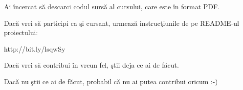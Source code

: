 Ai încercat să descarci codul sursă al cursului, care este în format PDF.

Dacă vrei să participi ca şi cursant, urmează instrucţiunile de pe README-ul
proiectului:

http://bit.ly/lsqwSy

Dacă vrei să contribui în vreun fel, ştii deja ce ai de făcut.

Dacă nu ştii ce ai de făcut, probabil că nu ai putea contribui oricum :-)

